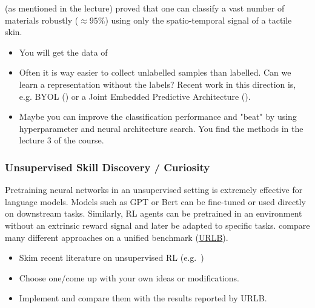 \documentclass[a4paper]{article}
\begin{document}
\citet{Tulbure2018} (as mentioned in the lecture) proved that one can classify a vast number of materials robustly ($\approx 95 \%$) using only the spatio-temporal signal of a tactile skin.

\begin{itemize}
  \item You will get the data of \citet{Tulbure2018}
  \item Often it is way easier to collect unlabelled samples than labelled. Can we learn a representation without the labels? Recent work in this direction is, e.g. BYOL (\citet{Grill2020}) or a Joint Embedded Predictive Architecture (\citet{assran2023selfsupervised}).
  \item Maybe you can improve the classification performance and "beat" \citet{Tulbure2018} by using hyperparameter and neural architecture search. You find the methods in the lecture 3 of the course.
\end{itemize}

%


\subsubsection{Unsupervised Skill Discovery / Curiosity}
Pretraining neural networks in an unsupervised setting is extremely effective for language models. Models such as GPT or Bert can be fine-tuned or used directly on downstream tasks.
Similarly, RL agents can be pretrained in an environment without an extrinsic reward signal and later be adapted to specific tasks.
\citet{Laskin2021} compare many different approaches on a unified benchmark (\href{https://github.com/rll-research/url_benchmark}{URLB}).
\begin{itemize}
  \item Skim recent literature on unsupervised RL (e.g.~\cite{Hafner2023, Laskin2022, Li2023InternalReward})
  \item Choose one/come up with your own ideas or modifications.
  \item Implement and compare them with the results reported by URLB.
\end{itemize}
\end{document}
